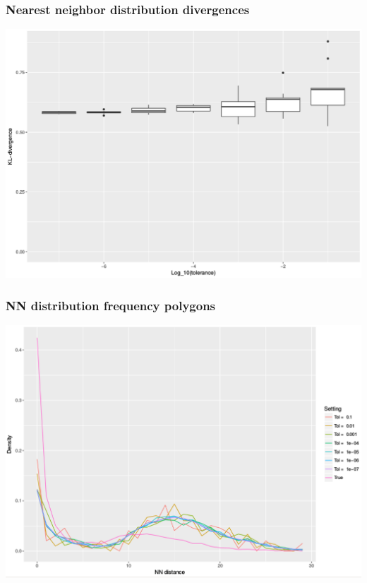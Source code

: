 \documentclass[mathserif,compress]{beamer}
\renewcommand\;{\,}
\begin{document}
\begin{frame}\frametitle{Nearest neighbor distribution divergences}
\begin{center}
\includegraphics[width=\linewidth]{Images/div_by_tol.png}
\end{center}
\end{frame}

\begin{frame}\frametitle{NN distribution frequency polygons}
\begin{center}
\includegraphics[width=\linewidth]{Images/hist_nn.png}
\end{center}
\end{frame}
\end{document}
